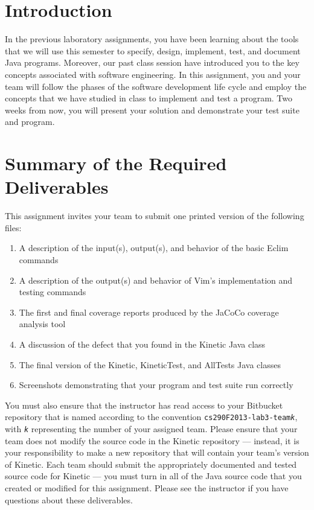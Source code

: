

\usepackage[compact]{titlesec}



\section*{Introduction}

In the previous laboratory assignments, you have been learning about the tools that we will use this semester to
specify, design, implement, test, and document Java programs. Moreover, our past class session have introduced you to
the key concepts associated with software engineering.  In this assignment, you and your team will follow the phases of
the software development life cycle and employ the concepts that we have studied in class  to implement and test a
program. Two weeks from now, you will present your solution and demonstrate your test suite and program.


\section*{Summary of the Required Deliverables}

This assignment invites your team to submit one printed version of the following files:

\begin{enumerate}
	
	\item A description of the input(s), output(s), and behavior of the basic Eclim commands 
	\item A description of the output(s) and behavior of Vim's implementation and testing commands
	\item The first and final coverage reports produced by the JaCoCo coverage analysis tool
	\item A discussion of the defect that you found in the Kinetic Java class
	\item The final version of the Kinetic, KineticTest, and AllTests Java classes
	\item Screenshots demonstrating that your program and test suite run correctly
\end{enumerate}

You must also ensure that the instructor has read access to your Bitbucket repository that is named according to the
convention {\tt cs290F2013-lab3-team{\em k}}, with {\tt {\em k}} representing the number of your assigned team.  Please
ensure that your team does not modify the source code in the Kinetic repository --- instead, it is your responsibility
to make a new repository that will contain your team's version of Kinetic.  Each team should submit the appropriately
documented and tested source code for Kinetic --- you must turn in all of the Java source code that you created
or modified for this assignment. Please see the instructor if you have questions about these deliverables.


